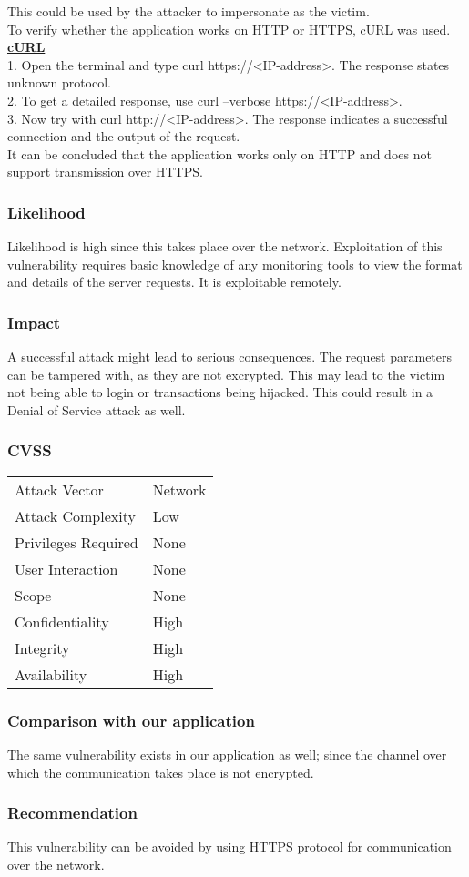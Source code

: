 This could be used by the attacker to impersonate as the victim. \\
To verify whether the application works on HTTP or HTTPS, cURL was used. \\
\underline{\textbf{cURL}}\\
1. Open the terminal and type curl https://<IP-address>.
The response states unknown protocol. \\
2. To get a detailed response, use curl --verbose https://<IP-address>. \\
3. Now try with curl http://<IP-address>.
The response indicates a successful connection and the output of the request. \\
It can be concluded that the application works only on HTTP and does not support transmission over HTTPS.

\subsubsection{Likelihood}
Likelihood is high since this takes place over the network.
Exploitation of this vulnerability requires basic knowledge of any monitoring tools to view the format and details of the server requests. It is exploitable remotely.

\subsubsection{Impact}
A successful attack might lead to serious consequences. The request parameters can be tampered with, as they are not excrypted. This may lead to the victim not being able to login  or transactions being hijacked. This could result in a Denial of Service attack as well.

\subsubsection{CVSS}
\begin{tabular}{l | l}
Attack Vector		& Network \\
Attack Complexity	& Low \\
Privileges Required & None \\
User Interaction	& None \\
Scope				& None \\
Confidentiality		& High \\
Integrity			& High \\
Availability		& High
\end{tabular}

\subsubsection{Comparison with our application}
The same vulnerability exists in our application as well; since the channel over which the communication takes place is not encrypted.

\subsubsection{Recommendation}
This vulnerability can be avoided by using HTTPS protocol for communication over the network.
\clearpage